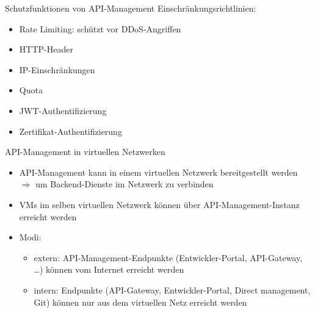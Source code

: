 \begin{flashcard}[]{Schutzfunktionen von API-Management}
  Einschränkungsrichtlinien:
  \begin{itemize}
    \item Rate Limiting: schützt vor DDoS-Angriffen
    \item HTTP-Header
    \item IP-Einschränkungen
    \item Quota
    \item JWT-Authentifizierung
    \item Zertifikat-Authentifizierung
  \end{itemize}
\end{flashcard}

\begin{flashcard}[]{API-Management in virtuellen Netzwerken}
  \begin{itemize}
    \item API-Management kann in einem virtuellen Netzwerk bereitgestellt werden\newline
      $\Rightarrow$ um Backend-Dienste im Netzwerk zu verbinden
    \item VMs im selben virtuellen Netzwerk können über API-Management-Instanz erreicht werden
    \item Modi:
      \begin{itemize}
        \item extern: API-Management-Endpunkte (Entwickler-Portal, API-Gateway, \ldots) können vom Internet erreicht werden
        \item intern: Endpunkte (API-Gateway, Entwickler-Portal, Direct management, Git) können nur aus dem virtuellen Netz erreicht werden
      \end{itemize}
  \end{itemize}
\end{flashcard}


